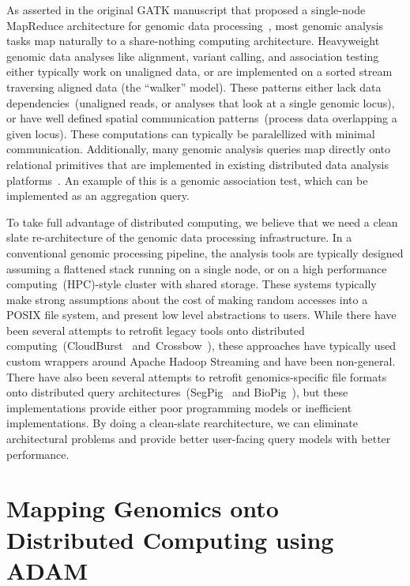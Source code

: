 \documentclass[phd]{ucbthesis}
\begin{document}
As asserted in the original GATK manuscript that proposed a single-node
MapReduce architecture for genomic data processing~\cite{mckenna10}, most
genomic analysis tasks map naturally to a share-nothing computing architecture.
Heavyweight genomic data analyses like alignment, variant calling, and
association testing either typically work on unaligned data, or are implemented
on a sorted stream traversing aligned data (the ``walker'' model). These
patterns either lack data dependencies~(unaligned reads, or analyses that look
at a single genomic locus), or have well defined spatial communication
patterns~(process data overlapping a given locus). These computations can
typically be paralellized with minimal communication. Additionally, many genomic
analysis queries map directly onto relational primitives that are implemented
in existing distributed data analysis platforms~\cite{armbrust15}. An example of
this is a genomic association test, which can be implemented as an aggregation
query.

To take full advantage of distributed computing, we believe that we need a
clean slate re-architecture of the genomic data processing infrastructure. In a
conventional genomic processing pipeline, the analysis tools are typically designed
assuming a flattened stack running on a single node, or on a high performance
computing~(HPC)-style cluster with shared storage. These systems typically make
strong assumptions about the cost of making random accesses into a POSIX file
system, and present low level abstractions to users. While there have been
several attempts to retrofit legacy tools onto distributed
computing~({CloudBurst}~\cite{schatz09}
and~{Crossbow}~\cite{langmead09crossbow}), these approaches have typically used
custom wrappers around {Apache Hadoop Streaming} and have been
non-general. There have also been several attempts to retrofit genomics-specific
file formats onto distributed query
architectures~({SegPig}~\cite{schumacher14} and
{BioPig}~\cite{nordberg13}), but these implementations provide either
poor programming models or inefficient implementations. By doing a clean-slate
rearchitecture, we can eliminate architectural problems and provide better
user-facing query models with better performance.

\section{Mapping Genomics onto Distributed Computing using {ADAM}}
\label{sec:mapping-genomics-to-distributed-computing}
\end{document}
